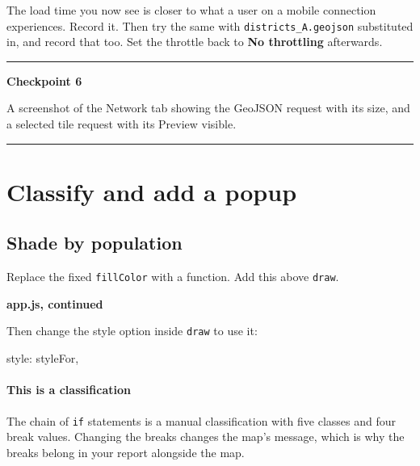 \documentclass{article}
\newcommand{\cd}[1]{\texttt{#1}}
\newcommand{\codecap}[1]{%
  \par\vspace{.9em}\noindent\textbf{#1}\par\vspace{-.6em}}
\newenvironment{keypoint}[1]
  {\par\vspace{.7em}\noindent\rule{\linewidth}{.6pt}\par\vspace{.15em}
   \noindent\textbf{#1}\par\nobreak\vspace{-.3em}}
  {\par\vspace{.15em}\noindent\rule{\linewidth}{.6pt}\par\vspace{.7em}}
\begin{document}
The load time you now see is closer to what a user on a mobile
connection experiences. Record it. Then try the same with
\cd{districts\_A.geojson} substituted in, and record that too. Set the
throttle back to \textbf{No throttling} afterwards.


\begin{keypoint}{Checkpoint 6}
A screenshot of the Network tab showing the GeoJSON request with its
size, and a selected tile request with its Preview visible.
\end{keypoint}


\section{Classify and add a popup}

\subsection{Shade by population}

Replace the fixed \cd{fillColor} with a function. Add this above
\cd{draw}.

\codecap{app.js, continued}

Then change the style option inside \cd{draw} to use it:

\begin{code}
      style: styleFor,
\end{code}

\paragraph{This is a classification}
The chain of \cd{if} statements is a manual classification with five
classes and four break values. Changing the breaks changes the map's
message, which is why the breaks belong in your report alongside the
map.
\end{document}
